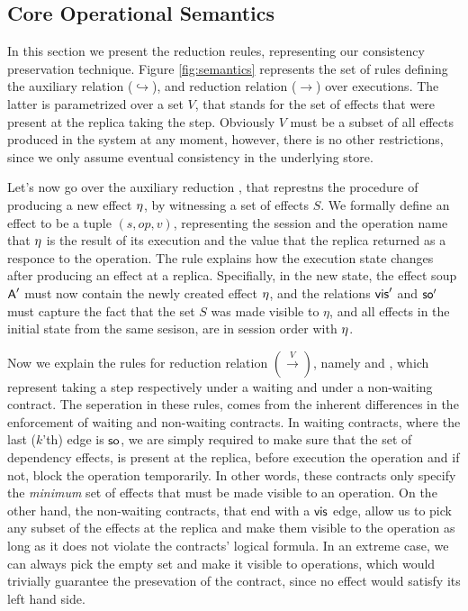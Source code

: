 \subsection{Core Operational Semantics}



In this section we present the reduction reules, representing our
consistency preservation technique.
Figure \ref{fig:semantics} represents the set of rules defining the
auxiliary relation ($\hookrightarrow$), and reduction relation 
($\rightarrow$) over executions. The latter is parametrized over a set $V$,
that stands for the set of effects that were present at the replica
taking the step. Obviously $V$ must be a subset of all effects produced
in the system at any moment, however, there is no other restrictions,
since we only assume eventual consistency in the underlying store.

Let's now go over the auxiliary reduction 
,
that represtns the procedure of producing a new effect $\eta$, by witnessing a set
of effects $S$. 
We formally define an effect to be a tuple $(s,op,v)$, representing the
session and the operation name that $\eta$ is the result of its execution and the value
that the replica returned as a responce to the operation.
The rule explains how the execution state changes after producing an
effect at a replica. Specifially, in the new state, the effect soup
${\normalfont \textsf{A}}'$ must
now contain the newly created effect $\eta$, and the relations ${\normalfont \textsf{vis}}'$
and ${\normalfont \textsf{so}}'$ must capture the fact that the set $S$ was made
visible to $\eta$, and all effects in the initial state from the same
sesison, are in session order with $\eta$.


Now we explain the rules for reduction relation $(\xrightarrow{V})$,
namely   and
, which represent taking a step respectively
under a waiting and under a non-waiting contract. The seperation in
these rules, comes from the inherent differences in the enforcement of
waiting and non-waiting contracts. In waiting contracts, where the last
($k$'th) edge is ${\normalfont \textsf{so}}$, we are simply required to make sure that the
set of dependency effects, is
present at the replica, before execution the operation and if not, block
the operation temporarily. In other words, these contracts only specify
the \emph{minimum} set of effects that must be made visible to an
operation. On the other hand, the non-waiting contracts, that end with a
${\normalfont \textsf{vis}}$ edge, allow us to pick any subset of the  effects at the
replica and make them visible to the operation as long as it does not
violate the contracts' logical formula. In an extreme case, we can
always pick the empty set and make it visible to operations, which
would trivially guarantee the presevation of the contract, since no effect
would satisfy its left hand side. 

